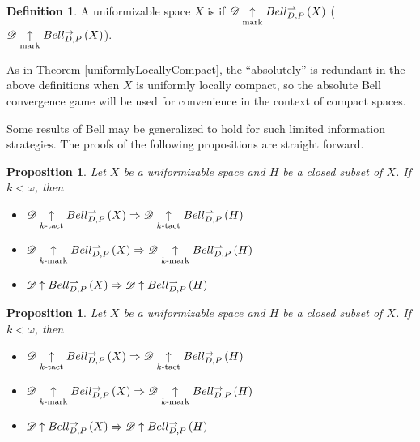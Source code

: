 \documentclass{amsart}
\newtheorem{proposition}[theorem]{Proposition}
\theoremstyle{definition}
\newtheorem{definition}[theorem]{Definition}
\begin{document}
  \begin{definition}
    A uniformizable space \(X\) is  if
    \(\mathscr{D} \underset{\text{mark}}{\uparrow} Bell_{D,P}^{\rightharpoonup}\left({X}\right)\) (\(\mathscr{D} \underset{\text{mark}}{\uparrow} Bell_{D,P}^{\to}\left({X}\right)\)).
  \end{definition}

  As in Theorem \ref{uniformlyLocallyCompact}, the ``absolutely''
  is redundant in the above definitions when \(X\) is uniformly locally compact,
  so the absolute Bell convergence game will be used for convenience in the
  context of compact spaces.

  Some results of Bell may be generalized to hold for such limited information
  strategies. The proofs of the following propositions are straight forward.

  \begin{proposition}
    Let \(X\) be a uniformizable space and \(H\) be a closed subset of \(X\).
    If \(k<\omega\), then
    \begin{itemize}
      \item
       \(
          \mathscr{D} \underset{k\text{-tact}}{\uparrow} Bell_{D,P}^{\rightharpoonup}\left({X}\right)
            \Rightarrow
          \mathscr{D} \underset{k\text{-tact}}{\uparrow} Bell_{D,P}^{\rightharpoonup}\left({H}\right)
       \)
      \item
       \(
          \mathscr{D} \underset{k\text{-mark}}{\uparrow} Bell_{D,P}^{\rightharpoonup}\left({X}\right)
            \Rightarrow
          \mathscr{D} \underset{k\text{-mark}}{\uparrow} Bell_{D,P}^{\rightharpoonup}\left({H}\right)
       \)
      \item
       \(
          \mathscr{D} \uparrow Bell_{D,P}^{\rightharpoonup}\left({X}\right)
            \Rightarrow
          \mathscr{D} \uparrow Bell_{D,P}^{\rightharpoonup}\left({H}\right)
       \)
    \end{itemize}
  \end{proposition}

  \begin{proposition}
    Let \(X\) be a uniformizable space and \(H\) be a closed subset of \(X\).
    If \(k<\omega\), then
    \begin{itemize}
      \item
       \(
          \mathscr{D} \underset{k\text{-tact}}{\uparrow} Bell_{D,P}^{\to}\left({X}\right)
            \Rightarrow
          \mathscr{D} \underset{k\text{-tact}}{\uparrow} Bell_{D,P}^{\to}\left({H}\right)
       \)
      \item
       \(
          \mathscr{D} \underset{k\text{-mark}}{\uparrow} Bell_{D,P}^{\to}\left({X}\right)
            \Rightarrow
          \mathscr{D} \underset{k\text{-mark}}{\uparrow} Bell_{D,P}^{\to}\left({H}\right)
       \)
      \item
       \(
          \mathscr{D} \uparrow Bell_{D,P}^{\to}\left({X}\right)
            \Rightarrow
          \mathscr{D} \uparrow Bell_{D,P}^{\to}\left({H}\right)
       \)
    \end{itemize}
  \end{proposition}
\end{document}
